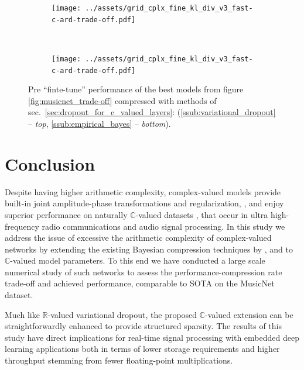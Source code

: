 \documentclass[a4paper,10pt]{article}
\newcommand{\real}{\mathbb{R}}
\newcommand{\cplx}{\mathbb{C}}
\begin{document}
\begin{figure}[!ht]
  \centering
  \begin{subfigure}[b]{0.9\textwidth}  %
    \centering
    \texttt{[image: ../assets/grid\_cplx\_fine\_kl\_div\_v3\_fast-c-ard-trade-off.pdf]}
  \end{subfigure} \\
  \begin{subfigure}[b]{0.9\textwidth}  %
    \centering
    \texttt{[image: ../assets/grid\_cplx\_fine\_kl\_div\_v3\_fast-c-ard-trade-off.pdf]}
  \end{subfigure}
  \caption{%
    Pre ``finte-tune'' performance of the best models from figure \ref{fig:musicnet_trade-off}
    compressed with methods of sec.~\ref{sec:dropout_for_c_valued_layers}:
    (\ref{ssub:variational_dropout} -- \textit{top}, \ref{ssub:empirical_bayes} --  \textit{bottom}).
  }
  \label{fig:musicnet_trade-off_pre_fune-tune}
\end{figure}



\section{Conclusion} %
\label{sec:conclusion}

Despite having higher arithmetic complexity, complex-valued models provide built-in
joint amplitude-phase transformations and regularization, \citep{hirose_complex-valued_2009},
and enjoy superior performance on naturally $\cplx$-valued datasets \citep{citation_needed},
that occur in ultra high-frequency radio communications and audio signal processing. In this
study we address the issue of excessive the arithmetic complexity of complex-valued networks
by extending the existing Bayesian compression techniques by \citet{kingma_variational_2015},
\citet{molchanov_variational_2017} and \citet{kharitonov_variational_2018} to $\cplx$-valued
model parameters. To this end we have conducted a large scale numerical study of such networks
to assess the performance-compression rate trade-off and achieved performance, comparable
to SOTA on the MusicNet dataset.

Much like $\real$-valued variational dropout, the proposed $\cplx$-valued extension can be
straightforwardly enhanced to provide structured sparsity. The results of this study have
direct implications for real-time signal processing with embedded deep learning applications
both in terms of lower storage requirements and higher throughput stemming from fewer
floating-point multiplications.
\end{document}
